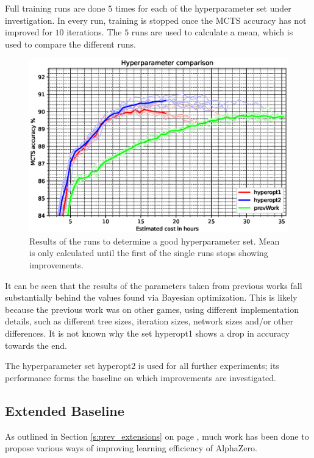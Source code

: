 \documentclass[12pt,onecolumn,oneside,titlepage]{article}
\begin{document}
Full training runs are done $5$ times for each of the hyperparameter set under investigation. In every run, training is stopped once the MCTS accuracy has not improved for $10$ iterations.
The $5$ runs are used to calculate a mean, which is used to compare the different runs.

\begin{figure}[H]
\centering
\includegraphics[clip,width=\columnwidth]{hyper_compare}
\caption{Results of the runs to determine a good hyperparameter set. Mean is only calculated until the first of the single runs stops showing improvements.}
\label{fig:hyper_compare_results}
\end{figure}


It can be seen that the results of the parameters taken from previous works fall substantially behind the values found via Bayesian optimization. This is likely because the previous work was on other games, 
using different implementation details, such as different tree sizes, iteration sizes, network sizes and/or other differences. It is not known why the set hyperopt1 shows a drop in accuracy towards the end.

The hyperparameter set hyperopt2 is used for all further experiments; its performance forms the baseline on which improvements are investigated.

\subsection{Extended Baseline} \label{s:exexp}

As outlined in Section \ref{s:prev_extensions} on page \pageref{s:prev_extensions}, much work has been done to propose various ways of improving learning efficiency of AlphaZero. 
\end{document}
